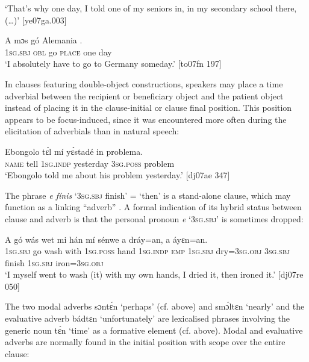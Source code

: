\glt ‘That’s why one day, I told one of my seniors in, in my secondary school 
there, (…)’ [ye07ga.003]
\z


\ea%
    \label{ex:key:844}
    \gll \MakeUppercase{A}   mɔs    gó  Alemania      .\\
\textsc{1sg.sbj}  \textsc{obl}    go  \textsc{place}    one    day\\

\glt ‘I absolutely have to go to Germany someday.’ [to07fn 197]
\z

In clauses featuring double-object constructions, speakers may place a time adverbial between the recipient or beneficiary object and the patient object instead of placing it in the clause-initial or clause final position. This position appears to be focus-induced, since it was encountered more often during the elicitation of adverbials than in natural speech:


\ea%
    \label{ex:key:845}
    \gll Ebongolo  tɛ́l  mí    yɛ́stadé    in    problema.\\
\textsc{name}    tell  \textsc{1sg.indp}  yesterday  \textsc{3sg.poss}  problem\\

\glt ‘Ebongolo told me about his problem yesterday.’ [dj07ae 347]
\z

The phrase \textit{e fínis} ‘\textsc{3sg.sbj} finish’ = ‘then’ is a stand-alone clause, which may function as a linking “adverb” . A formal indication of its hybrid status between clause and adverb is that the personal pronoun \textit{e} ‘\textsc{3sg.sbj}’ is sometimes dropped: 


\ea%
    \label{ex:key:846}
    \gll A    gó  wás    wet    mi    hán    mí    sénwe 
a    dráy=an,          a    áyɛn=an.\\ 
\textsc{1sg.sbj}  go  wash  with    \textsc{1sg.poss}  hand  \textsc{1sg.indp}  \textsc{emp} 
\textsc{1sg.sbj}  dry=\textsc{3sg.obj}  \textsc{3sg.sbj}  finish  \textsc{1sg.sbj}  iron=\textsc{3sg.obj}\\

\glt ‘I myself went to wash (it) with my own hands, I dried it, then ironed it.’ [dj07re 050]
\z

The two modal adverbs sɔntɛ́n ‘perhaps’ (cf.  above) and smɔ́ltɛn ‘nearly’  and the evaluative adverb bádtɛn ‘unfortunately’  are lexicalised phrases involving the generic noun tɛ́n ‘time’ as a formative element (cf.  above). Modal and evaluative adverbs are normally found in the initial position with scope over the entire clause: 


